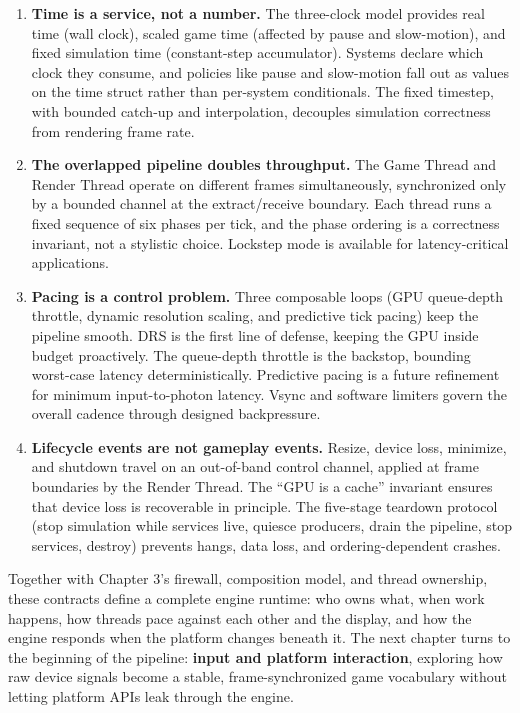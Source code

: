 \documentclass[
  11pt,
  letterpaper,
  DIV=11,
  numbers=noendperiod,
  twoside,
  open=right]{scrreprt}
\begin{document}
\begin{enumerate}
\def\labelenumi{\arabic{enumi}.}
\item
  \textbf{Time is a service, not a number.} The three-clock model
  provides real time (wall clock), scaled game time (affected by pause
  and slow-motion), and fixed simulation time (constant-step
  accumulator). Systems declare which clock they consume, and policies
  like pause and slow-motion fall out as values on the time struct
  rather than per-system conditionals. The fixed timestep, with bounded
  catch-up and interpolation, decouples simulation correctness from
  rendering frame rate.
\item
  \textbf{The overlapped pipeline doubles throughput.} The Game Thread
  and Render Thread operate on different frames simultaneously,
  synchronized only by a bounded channel at the extract/receive
  boundary. Each thread runs a fixed sequence of six phases per tick,
  and the phase ordering is a correctness invariant, not a stylistic
  choice. Lockstep mode is available for latency-critical applications.
\item
  \textbf{Pacing is a control problem.} Three composable loops (GPU
  queue-depth throttle, dynamic resolution scaling, and predictive tick
  pacing) keep the pipeline smooth. DRS is the first line of defense,
  keeping the GPU inside budget proactively. The queue-depth throttle is
  the backstop, bounding worst-case latency deterministically.
  Predictive pacing is a future refinement for minimum input-to-photon
  latency. Vsync and software limiters govern the overall cadence
  through designed backpressure.
\item
  \textbf{Lifecycle events are not gameplay events.} Resize, device
  loss, minimize, and shutdown travel on an out-of-band control channel,
  applied at frame boundaries by the Render Thread. The ``GPU is a
  cache'' invariant ensures that device loss is recoverable in
  principle. The five-stage teardown protocol (stop simulation while
  services live, quiesce producers, drain the pipeline, stop services,
  destroy) prevents hangs, data loss, and ordering-dependent crashes.
\end{enumerate}

Together with Chapter 3's firewall, composition model, and thread
ownership, these contracts define a complete engine runtime: who owns
what, when work happens, how threads pace against each other and the
display, and how the engine responds when the platform changes beneath
it. The next chapter turns to the beginning of the pipeline:
\textbf{input and platform interaction}, exploring how raw device
signals become a stable, frame-synchronized game vocabulary without
letting platform APIs leak through the engine.
\end{document}
